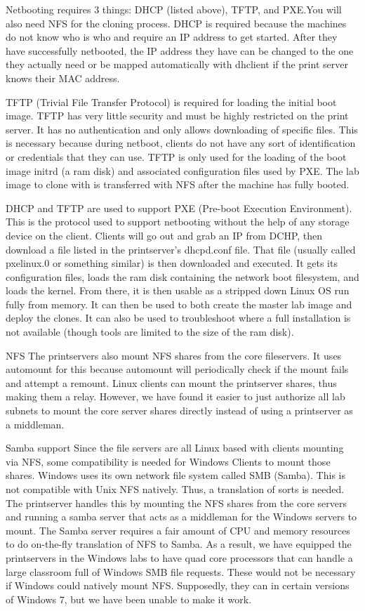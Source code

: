 Netbooting requires 3 things:  DHCP (listed above), TFTP, and PXE.You will also need NFS for the cloning process.  DHCP is required because the machines do not know who is who and require an IP address to get started.  After they have successfully netbooted, the IP address they have can be changed to the one they actually need or be mapped automatically with dhclient if the print server knows their MAC address.  

TFTP (Trivial File Transfer Protocol) is required for loading the initial boot image.  TFTP has very little security and must be highly restricted on the print server.  It has no authentication and only allows downloading of specific files.  This is necessary because during netboot, clients do not have any sort of identification or credentials that they can use.  TFTP is only used for the loading of the boot image initrd (a ram disk) and associated configuration files used by PXE.  The lab image to clone with is transferred with NFS after the machine has fully booted.  

DHCP and TFTP are used to support PXE (Pre-boot Execution Environment).  This is the protocol used to support netbooting without the help of any storage device on the client.  Clients will go out and grab an IP from DCHP, then download a file listed in the printserver's dhcpd.conf file.  That file (usually called pxelinux.0 or something similar) is then downloaded and executed.  It gets its configuration files, loads the ram disk containing the network boot filesystem, and loads the kernel.  From there, it is then usable as a stripped down Linux OS run fully from memory.  It can then be used to both create the master lab image and deploy the clones.  It can also be used to troubleshoot where a full installation is not available (though tools are limited to the size of the ram disk).

NFS
The printservers also mount NFS shares from the core fileservers.  It uses automount for this because automount will periodically check if the mount fails and attempt a remount.  Linux clients can mount the printserver shares, thus making them a relay.  However, we have found it easier to just authorize all lab subnets to mount the core server shares directly instead of using a printserver as a middleman.  

Samba support
Since the file servers are all Linux based with clients mounting via NFS, some compatibility is needed for Windows Clients to mount those shares.  Windows uses its own network file system called SMB (Samba).  This is not compatible with Unix NFS natively.  Thus, a translation of sorts is needed.  The printserver handles this by mounting the NFS shares from the core servers and running a samba server that acts as a middleman for the Windows servers to mount.  The Samba server requires a fair amount of CPU and memory resources to do on-the-fly translation of NFS to Samba. As a result, we have equipped the printservers in the Windows labs to have quad core processors that can handle a large classroom full of Windows SMB file requests. These would not be necessary if Windows could natively mount NFS. Supposedly, they can in certain versions of Windows 7, but we have been unable to make it work.

